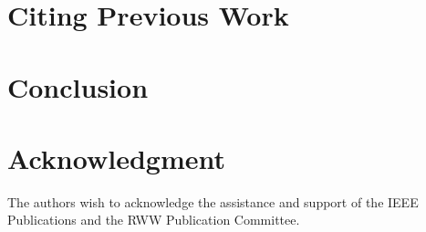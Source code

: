 \documentclass[10pt,conference,letterpaper]{RWWTemplate}
\begin{document}
\section{Citing Previous Work}



\section{Conclusion}


\section*{Acknowledgment}
The authors wish to acknowledge the assistance and support of the IEEE Publications and the RWW Publication Committee. 



\end{document}
